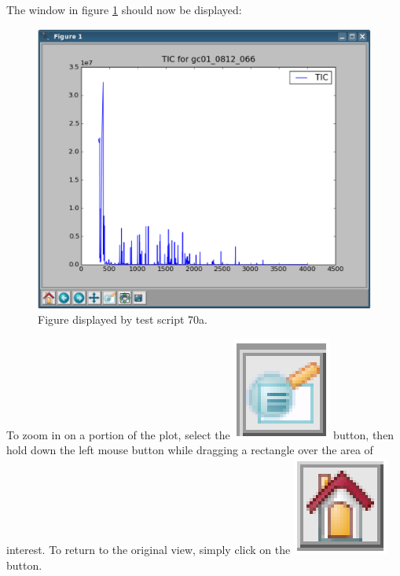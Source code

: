 The window in figure \ref{70a} should now be displayed:

\begin{figure}
  \begin{center}
    \includegraphics[scale=0.33]{graphics/chapter07/test-70a.eps}
  \end{center}
  \caption{Figure displayed by test script 70a.}
  \label{70a}
\end{figure}

To zoom in on a portion of the plot, select the
\includegraphics[scale=0.5]{graphics/chapter07/magnifier_button.eps}
button, then hold down the 
left mouse button while dragging a rectangle over the area of interest. To return
to the original view, simply click on the
\includegraphics[scale=0.5]{graphics/chapter07/home_button.eps}
button.

